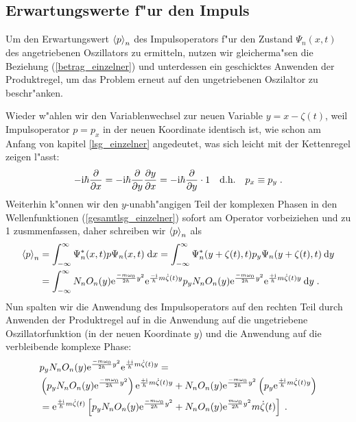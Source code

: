   \subsection{Erwartungswerte f"ur den Impuls}
    Um den Erwartungswert $\braket{p}_n$ des Impulsoperators f"ur den Zustand $\Psi_n(x,t)$ des angetriebenen Oszillators zu ermitteln, nutzen wir gleicherma"sen die Beziehung (\ref{betrag_einzelner}) und unterdessen ein geschicktes Anwenden der Produktregel, um das Problem erneut auf den ungetriebenen Oszilaltor zu beschr"anken.

    Wieder w"ahlen wir den Variablenwechsel zur neuen Variable $y=x-\zeta(t)$, weil Impulsoperator $p=p_x$ in der neuen Koordinate identisch ist, wie schon am Anfang von kapitel \ref{lsg_einzelner} angedeutet, was sich leicht mit der Kettenregel zeigen l"asst:
    \begin{equation}
      -\text i\hbar \frac{\partial}{\partial x} = -\text i\hbar \frac{\partial}{\partial y}\frac{\partial y}{\partial x} = -\text i\hbar \frac{\partial}{\partial y} \cdot 1 \quad \text{d.h.} \quad p_x \equiv p_y \; .
    \end{equation}
    Weiterhin k"onnen wir den $y$-unabh"angigen Teil der komplexen Phasen in den Wellenfunktionen (\ref{gesamtlsg_einzelner}) sofort am Operator vorbeiziehen und zu 1 zusmmenfassen, daher schreiben wir $\braket{p}_n$ als
    \begin{align}
      \braket{p}_n &= \int_{-\infty}^{\infty} \Psi^*_n(x,t) p \Psi_n(x,t) \; \text dx
      = \int_{-\infty}^{\infty} \Psi^*_n(y+\zeta(t),t) p_y \Psi_n(y+\zeta(t),t) \: \text dy \notag\\
      &= \int_{-\infty}^{\infty} N_nO_n(y)\text e^{\frac{-m\omega_0}{2\hbar}y^2}\text e^{\frac{-\text i}{\hbar}m\dot{\zeta}(t)y} p_y N_nO_n(y)\text e^{\frac{-m\omega_0}{2\hbar}y^2}\text e^{\frac{+\text i}{\hbar}m\dot{\zeta}(t)y} \: \text dy \; .
      \label{spaste}
    \end{align}
    Nun spalten wir die Anwendung des Impulsoperators auf den rechten Teil durch Anwenden der Produktregel auf in die Anwendung auf die ungetriebene Oszillatorfunktion (in der neuen Koordinate $y$) und die Anwendung auf die verbleibende komplexe Phase:
    \begin{align}
      &p_y N_nO_n(y)\text e^{\frac{-m\omega_0}{2\hbar}y^2}\text e^{\frac{+\text i}{\hbar}m\dot{\zeta}(t)y} = \notag\\
      &\left(p_y N_nO_n(y)\text e^{\frac{-m\omega_0}{2\hbar}y^2}\right) \text e^{\frac{+\text i}{\hbar}m\dot{\zeta}(t)y}
      + N_nO_n(y)\text e^{\frac{-m\omega_0}{2\hbar}y^2} \left(p_y \text e^{\frac{+\text i}{\hbar}m\dot{\zeta}(t)y}\right) \notag\\
      &= \text e^{\frac{+\text i}{\hbar}m\dot{\zeta}(t)} \left[p_yN_nO_n(y)\text e^{\frac{-m\omega_0}{2\hbar}y^2} + N_nO_n(y)\text e^{\frac{m\omega_0}{2\hbar}y^2}m\dot{\zeta}(t) \right] \; .
      \label{spaste2}
    \end{align}

